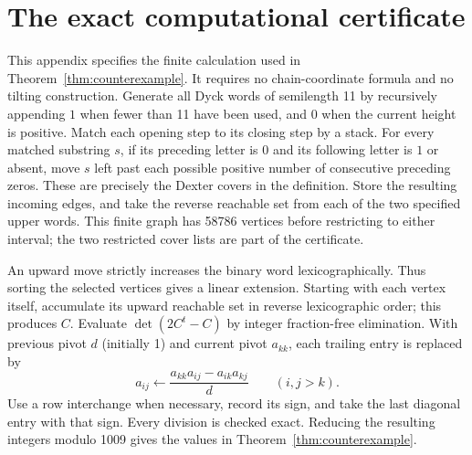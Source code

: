 \documentclass[11pt]{article}
\theoremstyle{definition}
\begin{document}
\appendix
\section{The exact computational certificate}
\label{app:certificate}
This appendix specifies the finite calculation used in
Theorem~\ref{thm:counterexample}. It requires no chain-coordinate
formula and no tilting construction.
Generate all Dyck words of semilength 11 by recursively appending $1$
when fewer than 11 have been used, and $0$ when the current height is
positive. Match each opening step to its closing step by a stack.
For every matched substring $s$, if its preceding letter is $0$ and
its following letter is $1$ or absent, move $s$ left past each possible
positive number of consecutive preceding zeros. These are precisely
the Dexter covers in the definition. Store the resulting incoming
edges, and take the reverse reachable set from each of the two
specified upper words. This finite graph has 58786 vertices before
restricting to either interval; the two restricted cover lists are
part of the certificate.

An upward move strictly increases the binary word lexicographically.
Thus sorting the selected vertices gives a linear extension. Starting
with each vertex itself, accumulate its upward reachable set in
reverse lexicographic order; this produces $C$. Evaluate $\det(2C^t-C)$
by integer fraction-free elimination. With previous pivot $d$ (initially
1) and current pivot $a_{kk}$, each trailing entry is replaced by
\[
 a_{ij}\longleftarrow
 \frac{a_{kk}a_{ij}-a_{ik}a_{kj}}{d}\qquad(i,j>k).
\]
Use a row interchange when necessary, record its sign, and take the
last diagonal entry with that sign. Every division is checked exact.
Reducing the resulting integers modulo 1009 gives the values
in Theorem~\ref{thm:counterexample}.
\end{document}
